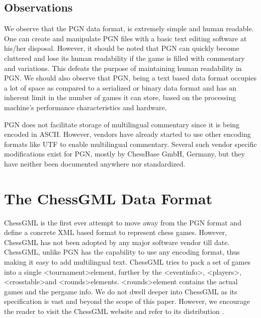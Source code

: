 \documentclass[conference]{IEEEtran}
\begin{document}
\subsection{Observations}
We observe that the PGN data format, is extremely simple and human readable. One can create and manipulate PGN files with a basic text editing software at his/her disposal. However, it should be noted that PGN can quickly become cluttered and lose its human readability if the game is filled with commentary and variations. This defeats the purpose of maintaining human readability in PGN. We should also observe that PGN, being a text based data format occupies a lot of space as compared to a serialized or binary data format and has an inherent limit in the number of games it can store, based on the processing machine's performance characteristics and hardware.

PGN does not facilitate storage of multilingual commentary since it is being encoded in ASCII. However, vendors have already started to use other encoding formats like UTF \cite{ab03} to enable multilingual commentary. Several such vendor specific modifications exist for PGN, mostly by ChessBase GmbH, Germany, but they have neither been documented anywhere nor standardized.


\section{The ChessGML Data Format}
ChessGML is the first ever attempt to move away from the PGN format and define a concrete XML based format to represent chess games. However, ChessGML has not been adopted by any major software vendor till date. ChessGML, unlike PGN has the capability to use any encoding format, thus making it easy to add multilingual text. ChessGML tries to pack a set of games into a single \textless tournament\textgreater  element, further by the \textless eventinfo\textgreater , \textless players\textgreater , \textless crosstable\textgreater  and \textless rounds\textgreater  elements. \textless rounds\textgreater  element contains the actual games and the per\textendash game info. We do not dwell deeper into ChessGML as its specification is vast and beyond the scope of this paper. However, we encourage the reader to visit the ChessGML website and refer to its distribution \cite{ab04}.
\end{document}
